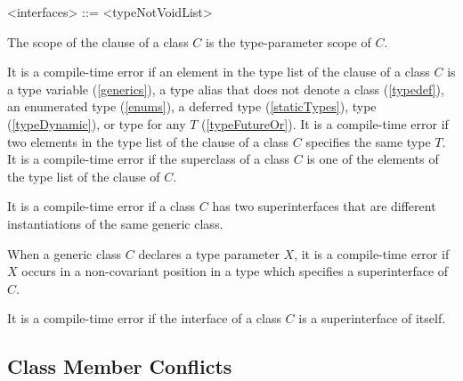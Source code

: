 \documentclass[makeidx]{article}
\begin{document}
\begin{grammar}
<interfaces> ::= \IMPLEMENTS{} <typeNotVoidList>
\end{grammar}

\LMHash{}%
The scope of the \IMPLEMENTS{} clause of a class $C$ is the type-parameter scope of $C$.

\LMHash{}%
It is a compile-time error if an element in the type list of the \IMPLEMENTS{} clause of a class $C$ is
a type variable (\ref{generics}), a type alias that does not denote a class (\ref{typedef}),
an enumerated type (\ref{enums}),
a deferred type (\ref{staticTypes}), type \DYNAMIC{} (\ref{typeDynamic}),
or type  for any $T$ (\ref{typeFutureOr}).
It is a compile-time error if two elements in the type list of
the \IMPLEMENTS{} clause of a class $C$ specifies the same type $T$.
It is a compile-time error if the superclass of a class $C$ is
one of the elements of the type list of the \IMPLEMENTS{} clause of $C$.


\LMHash{}%
It is a compile-time error if a class $C$ has two superinterfaces
that are different instantiations of the same generic class.

\LMHash{}%
When a generic class $C$ declares a type parameter $X$,
it is a compile-time error if $X$ occurs in a non-covariant position
in a type which specifies a superinterface of $C$.

\LMHash{}%
It is a compile-time error if the interface of a class $C$ is a superinterface of itself.



\subsection{Class Member Conflicts}
\end{document}
